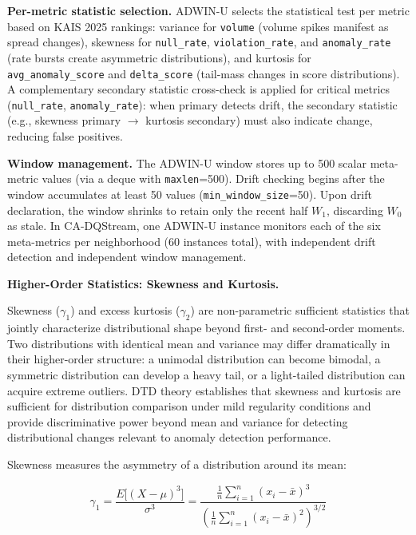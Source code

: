 \bigskip
\noindent\textbf{Per-metric statistic selection.} ADWIN-U selects the statistical test per metric based on KAIS 2025 rankings: variance for \texttt{volume} (volume spikes manifest as spread changes), skewness for \texttt{null\_rate}, \texttt{violation\_rate}, and \texttt{anomaly\_rate} (rate bursts create asymmetric distributions), and kurtosis for \texttt{avg\_anomaly\_score} and \texttt{delta\_score} (tail-mass changes in score distributions). A complementary secondary statistic cross-check is applied for critical metrics (\texttt{null\_rate}, \texttt{anomaly\_rate}): when primary detects drift, the secondary statistic (e.g., skewness primary $\rightarrow$ kurtosis secondary) must also indicate change, reducing false positives.

\bigskip
\noindent\textbf{Window management.} The ADWIN-U window stores up to 500 scalar meta-metric values (via a deque with \texttt{maxlen}=500). Drift checking begins after the window accumulates at least 50 values (\texttt{min\_window\_size}=50). Upon drift declaration, the window shrinks to retain only the recent half $W_1$, discarding $W_0$ as stale. In CA-DQStream, one ADWIN-U instance monitors each of the six meta-metrics per neighborhood (60 instances total), with independent drift detection and independent window management.

\bigskip
\noindent\textbf{Higher-Order Statistics: Skewness and Kurtosis.}

Skewness ($\gamma_1$) and excess kurtosis ($\gamma_2$) are non-parametric sufficient statistics that jointly characterize distributional shape beyond first- and second-order moments. Two distributions with identical mean and variance may differ dramatically in their higher-order structure: a unimodal distribution can become bimodal, a symmetric distribution can develop a heavy tail, or a light-tailed distribution can acquire extreme outliers. DTD theory \citep{dtd2026} establishes that skewness and kurtosis are sufficient for distribution comparison under mild regularity conditions and provide discriminative power beyond mean and variance for detecting distributional changes relevant to anomaly detection performance.

Skewness measures the asymmetry of a distribution around its mean:

\begin{equation}
\gamma_1 = \frac{E\big[(X - \mu)^3\big]}{\sigma^3}
        = \frac{\frac{1}{n}\sum_{i=1}^{n}(x_i - \bar{x})^3}
               {\left(\frac{1}{n}\sum_{i=1}^{n}(x_i - \bar{x})^2\right)^{3/2}}
\label{eq:skewness}
\end{equation}

